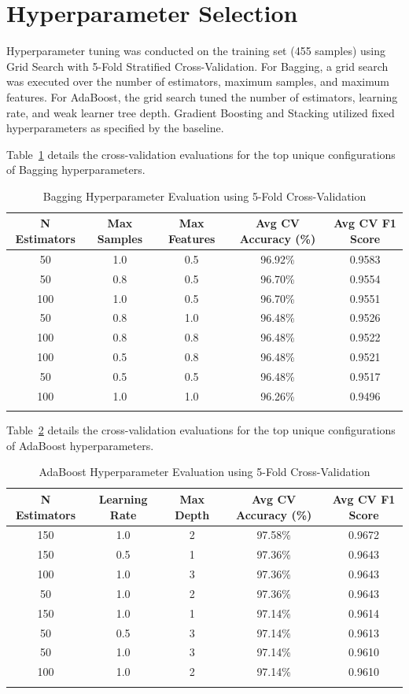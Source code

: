 \documentclass[12pt,a4paper]{article}
\begin{document}
\section{Hyperparameter Selection}
Hyperparameter tuning was conducted on the training set (455 samples) using Grid Search with 5-Fold Stratified Cross-Validation. For Bagging, a grid search was executed over the number of estimators, maximum samples, and maximum features. For AdaBoost, the grid search tuned the number of estimators, learning rate, and weak learner tree depth. Gradient Boosting and Stacking utilized fixed hyperparameters as specified by the baseline.

Table~\ref{tab:bagging_tuning} details the cross-validation evaluations for the top unique configurations of Bagging hyperparameters.

\begin{longtable}{|c|c|c|c|c|}
\hline
\textbf{N Estimators} & \textbf{Max Samples} & \textbf{Max Features} & \textbf{Avg CV Accuracy (\%)} & \textbf{Avg CV F1 Score} \\ \hline
\endhead
50 & 1.0 & 0.5 & 96.92\% & 0.9583 \\ \hline
50 & 0.8 & 0.5 & 96.70\% & 0.9554 \\ \hline
100 & 1.0 & 0.5 & 96.70\% & 0.9551 \\ \hline
50 & 0.8 & 1.0 & 96.48\% & 0.9526 \\ \hline
100 & 0.8 & 0.8 & 96.48\% & 0.9522 \\ \hline
100 & 0.5 & 0.8 & 96.48\% & 0.9521 \\ \hline
50 & 0.5 & 0.5 & 96.48\% & 0.9517 \\ \hline
100 & 1.0 & 1.0 & 96.26\% & 0.9496 \\ \hline
\caption{Bagging Hyperparameter Evaluation using 5-Fold Cross-Validation}
\label{tab:bagging_tuning}
\end{longtable}

Table~\ref{tab:boosting_tuning} details the cross-validation evaluations for the top unique configurations of AdaBoost hyperparameters.

\begin{longtable}{|c|c|c|c|c|}
\hline
\textbf{N Estimators} & \textbf{Learning Rate} & \textbf{Max Depth} & \textbf{Avg CV Accuracy (\%)} & \textbf{Avg CV F1 Score} \\ \hline
\endhead
150 & 1.0 & 2 & 97.58\% & 0.9672 \\ \hline
150 & 0.5 & 1 & 97.36\% & 0.9643 \\ \hline
100 & 1.0 & 3 & 97.36\% & 0.9643 \\ \hline
50 & 1.0 & 2 & 97.36\% & 0.9643 \\ \hline
150 & 1.0 & 1 & 97.14\% & 0.9614 \\ \hline
50 & 0.5 & 3 & 97.14\% & 0.9613 \\ \hline
50 & 1.0 & 3 & 97.14\% & 0.9610 \\ \hline
100 & 1.0 & 2 & 97.14\% & 0.9610 \\ \hline
\caption{AdaBoost Hyperparameter Evaluation using 5-Fold Cross-Validation}
\label{tab:boosting_tuning}
\end{longtable}
\end{document}
